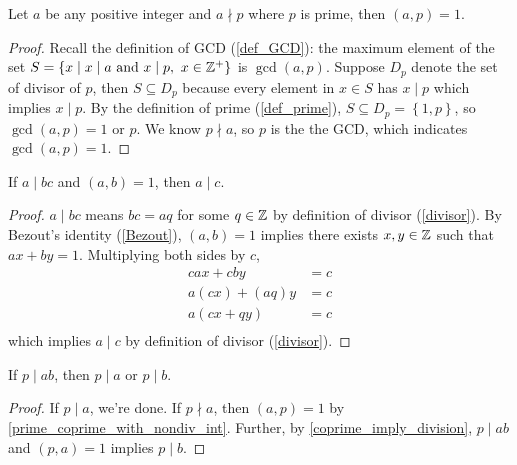 \begin{lemma}\label{prime_coprime_with_nondiv_int}
    Let $a$ be any positive integer and $a\nmid p$ where $p$ is prime, then $(a,p)=1$.
\end{lemma}
\begin{proof}
    Recall the definition of GCD (\ref{def_GCD}): the maximum element of the set $S = \{ x \mid x \mid a \text{ and } x \mid p ,\  x \in \mathbb{Z}^+ \}$ is $\gcd(a,p)$. Suppose $D_p$ denote the set of divisor of $p$, then $S\subseteq D_p$ because every element in $x\in S$ has $x\mid p$ which implies $x\mid p$. By the definition of prime (\ref{def_prime}), $S\subseteq D_p=\left\{1,p\right\}$, so $\gcd(a,p)=1 \text{ or } p$. We know $p\nmid a$, so $p$ is the the GCD, which indicates $\gcd(a,p)=1$.
\end{proof}

\begin{theorem}\label{coprime_imply_division}
    If $a\mid bc$ and $(a,b)=1$, then $a\mid c$.
\end{theorem}
\begin{proof}
    $a\mid bc$ means $bc=aq$ for some $q\in\mathbb{Z}$ by definition of divisor (\ref{divisor}). By Bezout's identity (\ref{Bezout}), $(a,b)=1$ implies there exists $x,y\in\mathbb{Z}$ such that $ax+by=1$. Multiplying both sides by $c$, 
    \begin{equation*}
        \begin{aligned}
            cax+cby&=c\\
            a(cx)+(aq)y&=c\\
            a(cx+qy)&=c\\
        \end{aligned}
    \end{equation*}
    which implies $a\mid c$ by definition of divisor (\ref{divisor}).
\end{proof}

\begin{theorem}\label{euclid-lemma}
    If $p\mid ab$, then $p\mid a$ or $p\mid b$.
\end{theorem}
\begin{proof}
    If $p\mid a$, we're done. If $p\nmid a$, then $(a,p)=1$ by \ref{prime_coprime_with_nondiv_int}. Further, by \ref{coprime_imply_division}, $p\mid ab$ and $(p,a)=1$ implies $p\mid b$. 
\end{proof}

